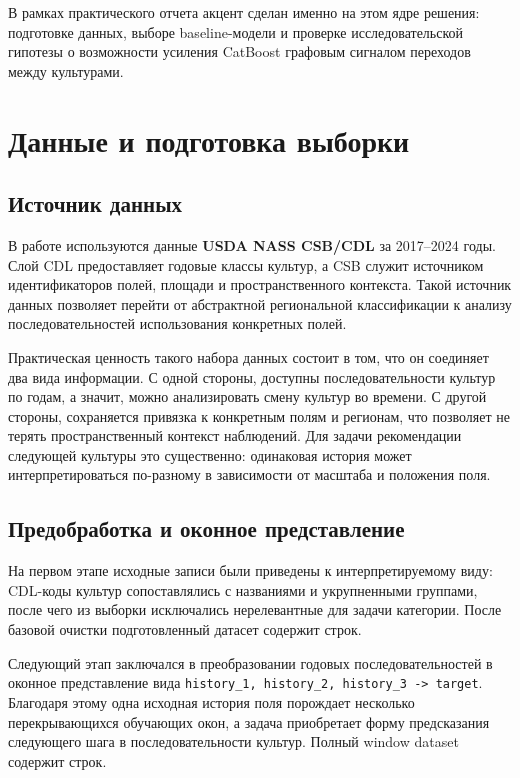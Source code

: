 В рамках практического отчета акцент сделан именно на этом ядре решения: подготовке данных, выборе baseline-модели и проверке исследовательской гипотезы о возможности усиления CatBoost графовым сигналом переходов между культурами.

\section{Данные и подготовка выборки}

\subsection{Источник данных}

В работе используются данные \textbf{USDA NASS CSB/CDL} за 2017--2024 годы. Слой CDL предоставляет годовые классы культур, а CSB служит источником идентификаторов полей, площади и пространственного контекста. Такой источник данных позволяет перейти от абстрактной региональной классификации к анализу последовательностей использования конкретных полей.

Практическая ценность такого набора данных состоит в том, что он соединяет два вида информации. С одной стороны, доступны последовательности культур по годам, а значит, можно анализировать смену культур во времени. С другой стороны, сохраняется привязка к конкретным полям и регионам, что позволяет не терять пространственный контекст наблюдений. Для задачи рекомендации следующей культуры это существенно: одинаковая история может интерпретироваться по-разному в зависимости от масштаба и положения поля.

\subsection{Предобработка и оконное представление}

На первом этапе исходные записи были приведены к интерпретируемому виду: CDL-коды культур сопоставлялись с названиями и укрупненными группами, после чего из выборки исключались нерелевантные для задачи категории. После базовой очистки подготовленный датасет содержит \PreparedRows{} строк.

Следующий этап заключался в преобразовании годовых последовательностей в оконное представление вида \texttt{history\_1, history\_2, history\_3 -> target}. Благодаря этому одна исходная история поля порождает несколько перекрывающихся обучающих окон, а задача приобретает форму предсказания следующего шага в последовательности культур. Полный window dataset содержит \WindowRows{} строк.

